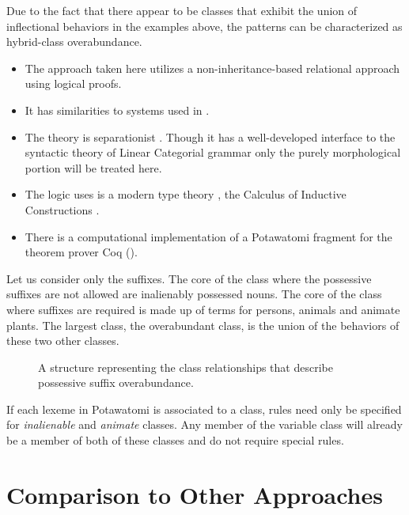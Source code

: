 Due to the fact that there appear to be classes that exhibit the union
of inflectional behaviors in the examples above, the patterns can be
characterized as hybrid-class overabundance.

\begin{itemize}
\item The approach taken here utilizes a non-inheritance-based
  relational approach using logical proofs.
\item It has similarities to systems used in \citet{lambek1997type,
    mcconville2006inheritance}.
\item The theory is separationist \citep{beard1995lexeme,
    aronoff1994morphology, sadler2001syntax}. Though it has a
  well-developed interface to the syntactic theory of Linear
  Categorial grammar \citep{smith2010correlational,
    mihalivcek2012distinguishing, mihalicek2012serbo,
    pollard2015agnostic, martin2013dynamics, martin2014dynamic,
    worth2016english, yasavul2017questions} only the purely
  morphological portion will be treated here.
\item The logic uses is a modern type theory
  \citep{martinlof1984intuitionistic}, the Calculus of Inductive
  Constructions \citep{coquand1988calculus, luo1990extended,
    coquand1990inductively}.
\item There is a computational implementation of a Potawatomi fragment
  for the theorem prover Coq ().
\end{itemize}

Let us consider only the suffixes. The core of the class where the
possessive suffixes are not allowed are inalienably possessed
nouns. The core of the class where suffixes are required is made up of
terms for persons, animals and animate plants. The largest class, the
overabundant class, is the union of the behaviors of these two other
classes.

\begin{figure}[H]
  \centering
  
  \caption{A structure representing the class relationships that
    describe possessive suffix overabundance.}
  \label{dpoles}
\end{figure}

If each lexeme in Potawatomi is associated to a class, rules need only
be specified for {\it inalienable} and {\it animate} classes. Any
member of the variable class will already be a member of both of these
classes and do not require special rules.

\section{Comparison to Other Approaches}

